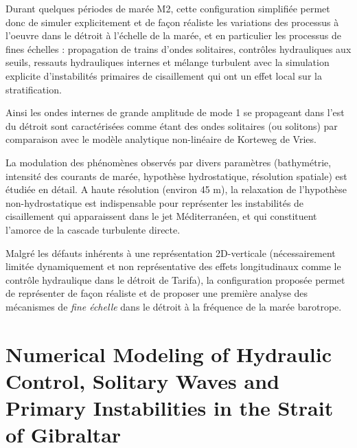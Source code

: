 Durant quelques périodes de marée M2, cette configuration simplifiée  permet donc de simuler explicitement et de façon réaliste les variations des processus à l'oeuvre dans le détroit à l'échelle de la marée, et en particulier les processus de fines échelles : propagation de trains d'ondes solitaires, contrôles hydrauliques aux seuils, ressauts hydrauliques internes et mélange turbulent avec la simulation explicite d'instabilités primaires de cisaillement qui ont un effet local sur la stratification. 

Ainsi les ondes internes de grande amplitude de mode 1 se propageant dans l'est du détroit sont caractérisées comme étant des ondes solitaires (ou solitons) par comparaison avec le modèle analytique non-linéaire de Korteweg de Vries. 

La modulation des phénomènes observés par divers paramètres (bathymétrie, intensité des courants de marée, hypothèse hydrostatique, résolution spatiale) est étudiée en détail. A haute résolution (environ 45 m), la relaxation de l'hypothèse non-hydrostatique est indispensable pour représenter les instabilités de cisaillement qui apparaissent dans le jet Méditerranéen, et qui constituent l'amorce de la cascade turbulente directe.

Malgré les défauts inhérents à une représentation 2D-verticale (nécessairement limitée dynamiquement et non représentative des effets longitudinaux comme le contrôle hydraulique dans le détroit de Tarifa), la configuration proposée permet de représenter de façon réaliste et de proposer une première analyse des mécanismes de \textit{fine échelle} dans le détroit à la fréquence de la marée barotrope.



\section[Numerical Modeling of Hydraulic Control, Solitary Waves and Primary Instabilities in the Strait of Gibraltar]{Numerical Modeling of Hydraulic Control, Solitary Waves and Primary Instabilities in the Strait of Gibraltar \citep{hilt_2020}}
\label{sectionSim2D}

